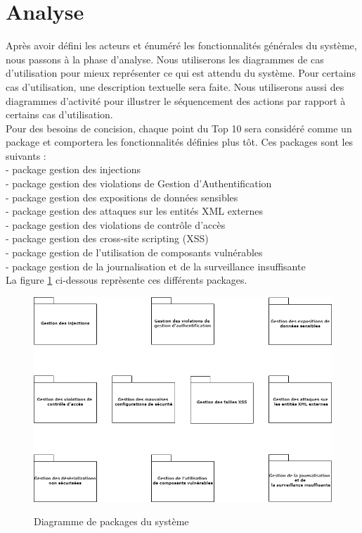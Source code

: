 \section{Analyse}
Après avoir défini les acteurs et énuméré les fonctionnalités générales du système, nous passons à la phase d'analyse. Nous utiliserons les diagrammes de cas d'utilisation pour mieux représenter ce qui est attendu du système. Pour certains cas d'utilisation, une description textuelle sera faite. Nous utiliserons aussi des diagrammes d'activité pour illustrer le séquencement des actions par rapport à certains cas d'utilisation.\\
Pour des besoins de concision, chaque point du Top 10 sera considéré comme un package et comportera les fonctionnalités définies plus tôt. Ces packages sont les suivants : \\
- package gestion des injections\\
- package gestion des violations de Gestion d’Authentification\\
- package gestion des expositions de données sensibles\\
- package gestion des attaques sur les entités XML externes\\
- package gestion des violations de contrôle d’accès\\
- package gestion des cross-site scripting (XSS)\\
- package gestion de l'utilisation de composants vulnérables\\
- package gestion de la journalisation et de la surveillance insuffisante\\
La figure \ref{fig:8.1} ci-dessous reprèsente ces différents packages.
\begin{figure}[h!]
	\centering
	\begin{minipage}{18cm}
		\centering
		{\includegraphics[height=0.27\textheight]{fig/Package-Diagram.png}}
	\end{minipage}
	\caption{Diagramme de packages du système}
	\label{fig:8.1}
\end{figure}

